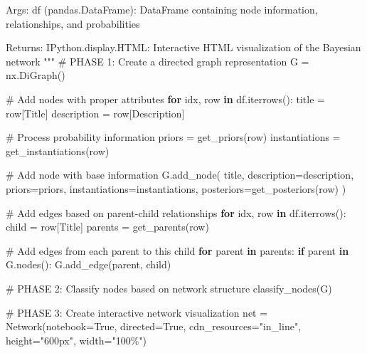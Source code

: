 \documentclass[
  11pt,
  letterpaper,
]{book}
\newenvironment{Shaded}{\begin{snugshade}}{\end{snugshade}}
\newcommand{\CommentTok}[1]{\textcolor[rgb]{0.37,0.37,0.37}{#1}}
\newcommand{\ControlFlowTok}[1]{\textcolor[rgb]{0.00,0.23,0.31}{\textbf{#1}}}
\newcommand{\KeywordTok}[1]{\textcolor[rgb]{0.00,0.23,0.31}{\textbf{#1}}}
\newcommand{\NormalTok}[1]{\textcolor[rgb]{0.00,0.23,0.31}{#1}}
\newcommand{\OperatorTok}[1]{\textcolor[rgb]{0.37,0.37,0.37}{#1}}
\newcommand{\StringTok}[1]{\textcolor[rgb]{0.13,0.47,0.30}{#1}}
\newcommand{\VariableTok}[1]{\textcolor[rgb]{0.07,0.07,0.07}{#1}}
\begin{document}
\begin{Shaded}
\begin{Highlighting}[]
\CommentTok{    Args:}
\CommentTok{        df (pandas.DataFrame): DataFrame containing node information, relationships, and probabilities}

\CommentTok{    Returns:}
\CommentTok{        IPython.display.HTML: Interactive HTML visualization of the Bayesian network}
\CommentTok{    """}
    \CommentTok{\# PHASE 1: Create a directed graph representation}
\NormalTok{    G }\OperatorTok{=}\NormalTok{ nx.DiGraph()}

    \CommentTok{\# Add nodes with proper attributes}
    \ControlFlowTok{for}\NormalTok{ idx, row }\KeywordTok{in}\NormalTok{ df.iterrows():}
\NormalTok{        title }\OperatorTok{=}\NormalTok{ row[}\StringTok{\textquotesingle{}Title\textquotesingle{}}\NormalTok{]}
\NormalTok{        description }\OperatorTok{=}\NormalTok{ row[}\StringTok{\textquotesingle{}Description\textquotesingle{}}\NormalTok{]}

        \CommentTok{\# Process probability information}
\NormalTok{        priors }\OperatorTok{=}\NormalTok{ get\_priors(row)}
\NormalTok{        instantiations }\OperatorTok{=}\NormalTok{ get\_instantiations(row)}

        \CommentTok{\# Add node with base information}
\NormalTok{        G.add\_node(}
\NormalTok{            title,}
\NormalTok{            description}\OperatorTok{=}\NormalTok{description,}
\NormalTok{            priors}\OperatorTok{=}\NormalTok{priors,}
\NormalTok{            instantiations}\OperatorTok{=}\NormalTok{instantiations,}
\NormalTok{            posteriors}\OperatorTok{=}\NormalTok{get\_posteriors(row)}
\NormalTok{        )}

    \CommentTok{\# Add edges based on parent{-}child relationships}
    \ControlFlowTok{for}\NormalTok{ idx, row }\KeywordTok{in}\NormalTok{ df.iterrows():}
\NormalTok{        child }\OperatorTok{=}\NormalTok{ row[}\StringTok{\textquotesingle{}Title\textquotesingle{}}\NormalTok{]}
\NormalTok{        parents }\OperatorTok{=}\NormalTok{ get\_parents(row)}

        \CommentTok{\# Add edges from each parent to this child}
        \ControlFlowTok{for}\NormalTok{ parent }\KeywordTok{in}\NormalTok{ parents:}
            \ControlFlowTok{if}\NormalTok{ parent }\KeywordTok{in}\NormalTok{ G.nodes():}
\NormalTok{                G.add\_edge(parent, child)}

    \CommentTok{\# PHASE 2: Classify nodes based on network structure}
\NormalTok{    classify\_nodes(G)}

    \CommentTok{\# PHASE 3: Create interactive network visualization}
\NormalTok{    net }\OperatorTok{=}\NormalTok{ Network(notebook}\OperatorTok{=}\VariableTok{True}\NormalTok{, directed}\OperatorTok{=}\VariableTok{True}\NormalTok{, cdn\_resources}\OperatorTok{=}\StringTok{"in\_line"}\NormalTok{, height}\OperatorTok{=}\StringTok{"600px"}\NormalTok{, width}\OperatorTok{=}\StringTok{"100\%"}\NormalTok{)}


\end{Highlighting}
\end{Shaded}
\end{document}
